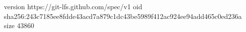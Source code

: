 version https://git-lfs.github.com/spec/v1
oid sha256:243c7185ee8fdde43acd7a879c1dc43be5989f412ac924ee94add465c0ed236a
size 43860
